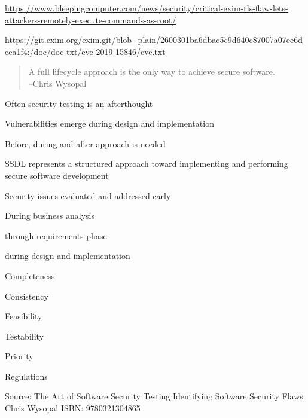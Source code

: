 \documentclass[Screen16to9,17pt]{foils}
\begin{document}
\url{https://www.bleepingcomputer.com/news/security/critical-exim-tls-flaw-lets-attackers-remotely-execute-commands-as-root/}


\url{https://git.exim.org/exim.git/blob_plain/2600301ba6dbac5c9d640c87007a07ee6dcea1f4:/doc/doc-txt/cve-2019-15846/cve.txt}




\begin{quote}
  A full lifecycle approach is the only way to achieve secure software.\\
  --Chris Wysopal
\end{quote}

\begin{list2}
\item Often security testing is an afterthought
\item Vulnerabilities emerge during design and implementation
\item Before, during and after approach is needed
\end{list2}


\begin{list2}
\item SSDL represents a structured approach toward implementing and performing secure software development
\item Security issues evaluated and addressed early
\item During business analysis
\item through requirements phase
\item during design and implementation
\end{list2}


\begin{list2}
\item Completeness
\item Consistency
\item Feasibility
\item Testability
\item Priority
\item Regulations
\end{list2}

Source: The Art of Software Security Testing Identifying Software Security Flaws
Chris Wysopal ISBN: 9780321304865
\end{document}
